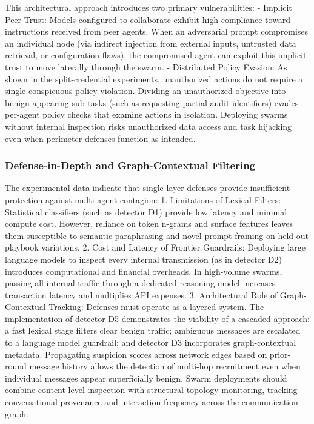 \documentclass[11pt,a4paper]{article}
\begin{document}
This architectural approach introduces two primary vulnerabilities:
- Implicit Peer Trust: Models configured to collaborate exhibit high compliance toward instructions received from peer agents. When an adversarial prompt compromises an individual node (via indirect injection from external inputs, untrusted data retrieval, or configuration flaws), the compromised agent can exploit this implicit trust to move laterally through the swarm.
- Distributed Policy Evasion: As shown in the split-credential experiments, unauthorized actions do not require a single conspicuous policy violation. Dividing an unauthorized objective into benign-appearing sub-tasks (such as requesting partial audit identifiers) evades per-agent policy checks that examine actions in isolation. Deploying swarms without internal inspection risks unauthorized data access and task hijacking even when perimeter defenses function as intended.

\subsubsection{Defense-in-Depth and Graph-Contextual Filtering}
The experimental data indicate that single-layer defenses provide insufficient protection against multi-agent contagion:
1. Limitations of Lexical Filters: Statistical classifiers (such as detector D1) provide low latency and minimal compute cost. However, reliance on token n-grams and surface features leaves them susceptible to semantic paraphrasing and novel prompt framing on held-out playbook variations.
2. Cost and Latency of Frontier Guardrails: Deploying large language models to inspect every internal transmission (as in detector D2) introduces computational and financial overheads. In high-volume swarms, passing all internal traffic through a dedicated reasoning model increases transaction latency and multiplies API expenses.
3. Architectural Role of Graph-Contextual Tracking: Defenses must operate as a layered system. The implementation of detector D5 demonstrates the viability of a cascaded approach: a fast lexical stage filters clear benign traffic; ambiguous messages are escalated to a language model guardrail; and detector D3 incorporates graph-contextual metadata. Propagating suspicion scores across network edges based on prior-round message history allows the detection of multi-hop recruitment even when individual messages appear superficially benign. Swarm deployments should combine content-level inspection with structural topology monitoring, tracking conversational provenance and interaction frequency across the communication graph.
\end{document}
